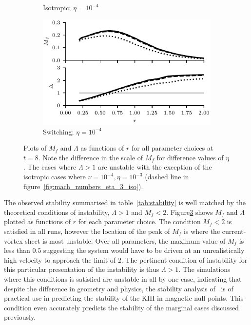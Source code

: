 \begin{figure}[h]
\begin{subfigure}{0.49\textwidth}
      \caption{Isotropic; $\eta = 10^{-4}$}%
      \label{fig:mach_numbers_eta_4_iso}
    \end{subfigure}
    \hfill
    \begin{subfigure}{0.49\textwidth}
      \centering
  \includegraphics[width=1.0\linewidth]{param_study/mach_numbers_eta_4_swi.pdf}
      \caption{Switching; $\eta = 10^{-4}$}%
      \label{fig:mach_numbers_eta_4_swi}
    \end{subfigure}

  \caption{Plots of $M_f$ and $\Lambda$ as functions of $r$ for all parameter choices at $t=8$. Note the difference in the scale of $M_f$ for difference values of $\eta$. The cases where $\Lambda > 1$ are unstable with the exception of the isotropic cases where $\nu=10^{-4},\eta=10^{-3}$ (dashed line in figure~\ref{fig:mach_numbers_eta_3_iso}).}%
  \label{fig:mach_numbers}
\end{figure}

The observed stability summarised in table~\ref{tab:stability} is well matched by the theoretical conditions of instability, $\Lambda > 1$ and $M_f < 2$. Figure\ref{fig:mach_numbers} shows $M_f$ and $\Lambda$ plotted as functions of $r$ for each parameter choice. The condition $M_f < 2$ is satisfied in all runs, however the location of the peak of $M_f$ is where the current-vortex sheet is most unstable. Over all parameters, the maximum value of $M_f$ is less than $0.5$ suggesting the system would have to be driven at an unrealistically high velocity to approach the limit of $2$. The pertinent condition of instability for this particular presentation of the instability is thus $\Lambda > 1$. The simulations where this conditions is satisfied are unstable in all by one case, indicating that despite the difference in geometry and physics, the stability analysis of~\cite{einaudiResistiveInstabilitiesFlowing1986} is of practical use in predicting the stability of the KHI in magnetic null points. This condition even accurately predicts the stability of the marginal cases discussed previously. 

